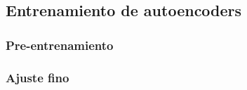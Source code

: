 \textcite{hinton2006autoencoder}

\subsection{Entrenamiento de
autoencoders}\label{entrenamiento-de-autoencoders}

\subsubsection{Pre-entrenamiento}\label{pre-entrenamiento}

\subsubsection{Ajuste fino}\label{ajuste-fino}

